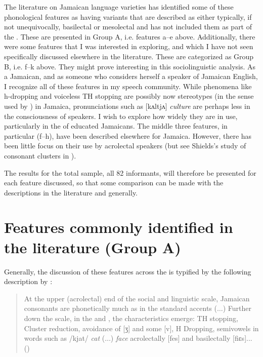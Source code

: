 The literature on Jamaican language varieties has identified some of these phonological features as having variants that are described as either typically, if not unequivocally, basilectal or mesolectal and has not included them as part of the .  These are presented in Group A, i.e. features a–e above.  Additionally, there were some features that I was interested in exploring, and which I have not seen specifically discussed elsewhere in the literature.  These are categorized as Group B, i.e. f–k above.  They might prove interesting in this sociolinguistic analysis.  As a Jamaican, and as someone who considers herself a  speaker of Jamaican English, I recognize all of these features in my speech community.  While phenomena like h-dropping and voiceless TH stopping are possibly now stereotypes (in the sense used by \citealt[248]{Labov1972}) in Jamaica, pronunciations such as [kʌltjʌ] \textit{culture} are perhaps less in the consciousness of speakers.  I wish to explore how widely they are in use, particularly in the  of educated Jamaicans.  The middle three features, in particular (f–h), have been described elsewhere for Jamaica.  However, there has been little focus on their use by acrolectal speakers (but see Shields’s \citeyear{Shields1987,Shields1984} study of consonant clusters in ).  

The results for the total  sample, all 82 informants, will therefore be presented for each feature discussed, so that some comparison can be made with the descriptions in the literature and generally.   


\section{Features commonly identified in the literature (Group A)}\label{sec:2.3}%

Generally, the discussion of these features across the  is typified by the following description by \citeauthor{Wells1982c}: 

\begin{quote}
At the upper (acrolectal) end of the social and linguistic scale, Jamaican consonants are phonetically much as in the standard accents (${\ldots}$) Further down the scale, in the  and , the characteristics emerge: TH stopping, Cluster reduction, avoidance of [ʒ] and some [v], H Dropping, semivowels in words such as /kjat/ \textit{cat} (${\ldots}$) \textit{face} acrolectally [fes] and basilectally [fiɛs]...
\hfill\hbox{(\citeyear[575--576]{Wells1982c})}\end{quote}


